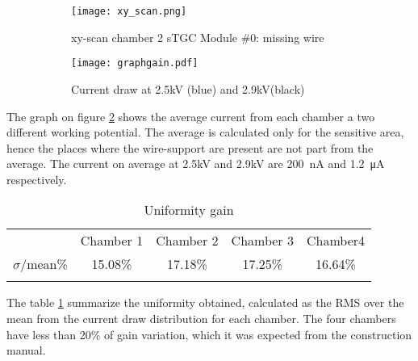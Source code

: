 \begin{figure}[ht]
		\centering
		\hspace*{\fill}
		\begin{subfigure}[b]{0.45\textwidth}
			\centering
			\texttt{[image: xy\_scan.png]}
			\caption{xy-scan chamber 2 sTGC Module \#0: missing wire}\label{fig:xyscan}
		\end{subfigure}
		\hfill
		\begin{subfigure}[b]{0.45\textwidth}
			\centering
			\texttt{[image: graphgain.pdf]}
			\caption{Current draw at 2.5kV (blue) and 2.9kV(black)}\label{fig:draw}
		\end{subfigure}
		\hspace*{\fill}
		\caption{ }\label{}
\end{figure}


The graph on figure \ref{fig:draw} shows the average current from each chamber a two different working potential. The
average is calculated only for the sensitive area, hence the places where the wire-support are present are not part from
the average. The current on average at 2.5kV and 2.9kV are \SI{200}{nA} and \SI{1.2}{\micro A} respectively.\par 


\begin{table}
	\centering
	\begin{tabular}{ccccc}
	\hline
	& Chamber 1&Chamber 2 & Chamber 3 & Chamber4\\
	$\sigma$/mean\% 	
	 & 15.08\%  
& 17.18\%  
	 & 17.25\%  
	& 16.64\%  \\
	\hline\\
	\end{tabular}
	\caption{Uniformity gain}\label{table}
\end{table}

The table \ref{table} summarize the uniformity obtained, calculated as the RMS over the mean from the current draw
distribution for each chamber. The four chambers have less than 20\% of gain variation, which it was expected from the
construction manual.\par




